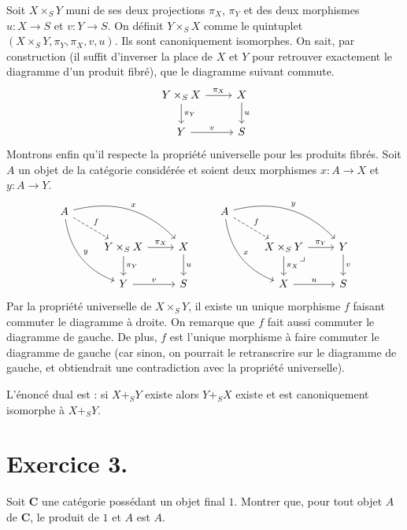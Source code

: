 \documentclass{../../td}
\let\bm\boldsymbol
\newcommand\pullback{\arrow[very near start,description,phantom]{dr}{\lrcorner}}
\begin{document}
  Soit $X \times_S Y$ muni de ses deux projections $\pi_X$, $\pi_Y$ et des deux morphismes~$u : X \to S$ et $v : Y \to S$.
  On définit $Y \times_S X$ comme le quintuplet $(X \times_S Y, \pi_Y, \pi_X, v, u)$.
  Ils sont canoniquement isomorphes.
  On sait, par construction (il suffit d'inverser la place de $X$ et $Y$ pour retrouver exactement le diagramme d'un produit fibré), que le diagramme suivant commute.
  \[
  \begin{tikzcd}
    Y \times_S X \arrow{r}{\pi_X}\arrow{d}{\pi_Y} & X\arrow{d}{u}\\
    Y \arrow{r}{v} & S
  \end{tikzcd}
  \]
  Montrons enfin qu'il respecte la propriété universelle pour les produits fibrés.
  Soit $A$ un objet de la catégorie considérée et soient deux morphismes $x: A \to X$ et~$y: A \to Y$.
  \[
  \begin{tikzcd}
    A\arrow[dashed]{dr}{f} \arrow[bend left]{drr}{x} \arrow[bend right]{ddr}{y}\\
    & Y \times_S X \arrow{r}{\pi_X}\arrow{d}{\pi_Y} & X\arrow{d}{u}\\
    &Y \arrow{r}{v} & S
  \end{tikzcd}
  \quad\quad
  \begin{tikzcd}
    A\arrow[dashed]{dr}{f} \arrow[bend left]{drr}{y} \arrow[bend right]{ddr}{x}\\
    & X \times_S Y \arrow{r}{\pi_Y}\arrow{d}{\pi_X}\pullback & Y\arrow{d}{v}\\
    &X \arrow{r}{u} & S
  \end{tikzcd}
  \]
  Par la propriété universelle de $X \times_S Y$, il existe un unique morphisme $f$ faisant commuter le diagramme à droite.
  On remarque que $f$ fait aussi commuter le diagramme de gauche.
  De plus, $f$ est l'unique morphisme à faire commuter le diagramme de gauche (car sinon, on pourrait le retranscrire sur le diagramme de gauche, et obtiendrait une contradiction avec la propriété universelle).

  L'énoncé dual est :
  si $X +_S Y$ existe alors  $Y +_S X$ existe et est canoniquement isomorphe à  $X +_S Y$.

  \chapter{Exercice 3.}

  \begin{slshape}
    \color{deepblue}
    Soit $\mathbf{C}$ une catégorie possédant un objet final $\bm{\mathit{1}}$.
    Montrer que, pour tout objet $A$ de $\mathbf{C}$, le produit de $\bm{\mathit{1}}$ et $A$ est $A$.
  \end{slshape}
\end{document}
